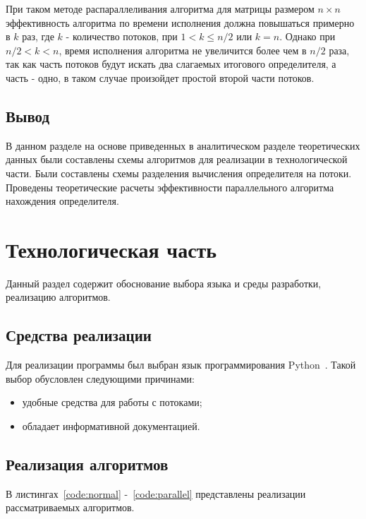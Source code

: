 \documentclass[12pt]{report}
\begin{document}
    При таком методе распараллеливания алгоритма для матрицы размером $n \times n$ эффективность
    алгоритма по времени исполнения должна повышаться примерно в $k$ раз, где $k$ - количество потоков,
    при $1 < k \leq n / 2$ или $k = n$.
    Однако при $ n / 2 < k < n$, время исполнения алгоритма не увеличится более чем в $n / 2$ раза,
    так как часть потоков будут искать два слагаемых итогового определителя, а часть - одно,
    в таком случае произойдет простой второй части потоков.


    \section{Вывод}
    В данном разделе на основе приведенных в аналитическом разделе теоретических данных
    были составлены схемы алгоритмов для реализации в технологической части.
    Были составлены схемы разделения вычисления определителя на потоки.
    Проведены теоретические расчеты эффективности параллельного алгоритма нахождения определителя.
    \newpage


    \chapter{Технологическая часть}
    Данный раздел содержит обоснование выбора языка и среды разработки, реализацию алгоритмов.


    \section{Средства реализации}
    Для реализации программы был выбран язык программирования Python~\cite{Python}.
    Такой выбор обусловлен следующими причинами:
    \begin{itemize}
        \item удобные средства для работы с потоками;
        \item обладает информативной документацией.
    \end{itemize}


    \section{Реализация алгоритмов}
    В листингах~\ref{code:normal} -~\ref{code:parallel} представлены
    реализации рассматриваемых алгоритмов.
\end{document}
